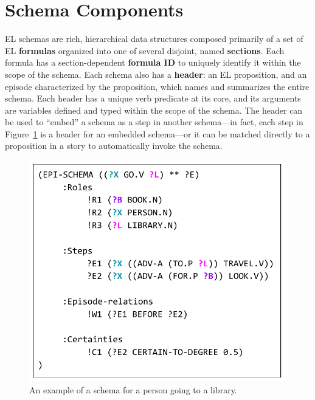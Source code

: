 \section{Schema Components}
EL schemas are rich, hierarchical data structures composed primarily of a set of EL \textbf{formulas} organized into one of several disjoint, named \textbf{sections}.
Each formula has a section-dependent \textbf{formula ID} to uniquely identify it within the scope of the schema.
Each schema also has a \textbf{header}: an EL proposition, and an episode characterized by the proposition, which names and summarizes the entire schema. 
Each header has a unique verb predicate at its core, and its arguments are variables defined and typed within the scope of the schema.
The header can be used to ``embed'' a schema as a step in another schema---in fact, each step in Figure~\ref{fig:libschema} is a header for an embedded schema---or it can be matched directly to a proposition in a story to automatically invoke the schema.

\begin{figure}
    \centering
    \includegraphics[width=0.65\columnwidth]{CH3_schemas/egschema.pdf}
    \caption{An example of a schema for a person going to a library.}
    \label{fig:libschema}
\end{figure}

